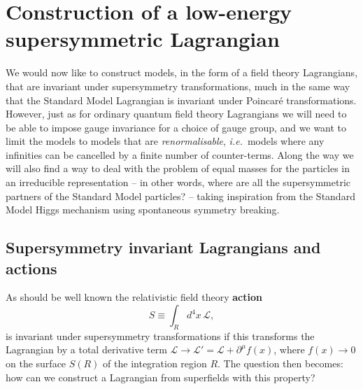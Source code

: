 \documentclass[notes.tex]{subfiles}
\begin{document}
\chapter[Construction of a low-energy SUSY Lagrangian]{Construction of a low-energy supersymmetric Lagrangian}
\label{chap:lagrangian}
We would now like to construct models, in the form of a field theory Lagrangians, that are invariant under supersymmetry transformations, much in the same way that the Standard Model Lagrangian is invariant under Poincar\'e transformations. However, just as for ordinary quantum field theory Lagrangians we will need to be able to impose gauge invariance for a choice of gauge group, and we want to limit the models to models that are {\it renormalisable}, {\it i.e.}\ models where any infinities can be cancelled by a finite number of counter-terms. Along the way we will also find a way to deal with the problem of equal masses for the particles in an irreducible representation -- in other words, where are all the supersymmetric partners of the Standard Model particles? -- taking inspiration from the Standard Model Higgs mechanism using spontaneous symmetry breaking.



\section[Supersymmetry invariant Lagrangians]{Supersymmetry invariant Lagrangians and actions}
As should be well known the relativistic field theory {\bf action}
\begin{equation}
S\equiv \int_R d^4x\,\mathcal{L},
\end{equation}
is invariant under supersymmetry transformations if this transforms the Lagrangian by a total derivative term $\mathcal{L} \to \mathcal{L}' = \mathcal{L} + \partial^\mu f(x)$, where $f(x) \to 0$ on the surface $S(R)$ of the integration region $R$. The question then becomes: how can we construct a Lagrangian from superfields with this property? 
\end{document}
